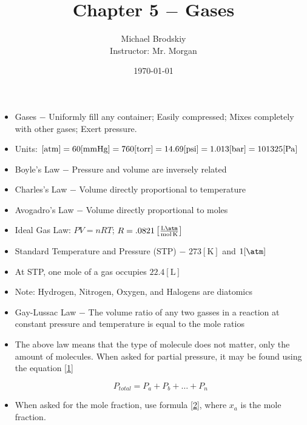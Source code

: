 \documentclass[12pt]{article}
\title{Chapter 5 $-$ Gases}
\date{\today}
\author{Michael Brodskiy\\ \small Instructor: Mr. Morgan}
\begin{document}
\maketitle

\begin{itemize}

  \item Gases $-$ Uniformly fill any container; Easily compressed; Mixes completely with other gases; Exert pressure.

  \item Units: $[\si{atm}]=60[\si{\milli\meter}\ce{Hg}]=760[\si{torr}]=14.69[\si{psi}]=1.013[\si{bar}]=101325[\si{\pascal}]$

  \item Boyle's Law $-$ Pressure and volume are inversely related

  \item Charles's Law $-$ Volume directly proportional to temperature

  \item Avogadro's Law $-$ Volume directly proportional to moles

  \item Ideal Gas Law: $PV=nRT$; $R=.0821\left[ \frac{\si{\liter\atm}}{\si{\mole\kelvin}} \right]$

  \item Standard Temperature and Pressure (STP) $-$ $273[\si{\kelvin}]$ and $1[\si{\atm}]$

  \item At STP, one mole of a gas occupies $22.4[\si{\liter}]$

  \item Note: Hydrogen, Nitrogen, Oxygen, and Halogens are diatomics


  \item Gay-Lussac Law $-$ The volume ratio of any two gasses in a reaction at constant pressure and temperature is equal to the mole ratios

  \item The above law means that the type of molecule does not matter, only the amount of molecules. When asked for partial pressure, it may be found using the equation \eqref{1}

    \begin{equation}
      P_{total}=P_a+P_b+\dots+P_n
      \label{1}
    \end{equation}

  \item When asked for the mole fraction, use formula \eqref{2}, where $x_a$ is the mole fraction.


\end{itemize}
\end{document}
